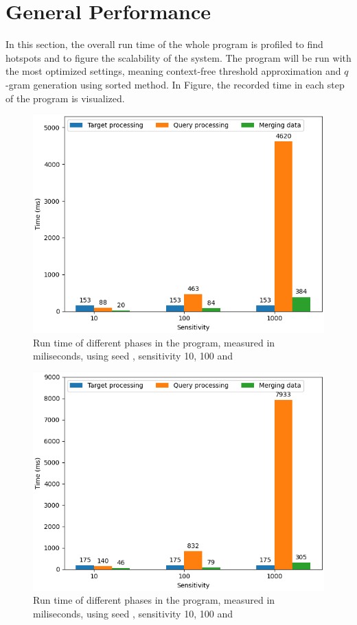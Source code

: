 \documentclass[twoside,a4paper,bsc]{master}
\newcommand{\Qgram}[1]{\(#1\)-gram}
\begin{document}
\section{General Performance}
In this section, the overall run time of the whole program is profiled to
find hotspots and to figure the scalability of the system. The program will
be run with the most optimized settings, meaning context-free threshold
approximation and \Qgram{q} generation using sorted method. In Figure, the
recorded time in each step of the program is visualized.
\begin{figure}
\centering
\includegraphics[scale=0.6]{graphics/program_w6.png}
\caption{Run time of different phases in the program, measured in
miliseconds,
using seed , sensitivity 10, 100 and }
\label{fig:program_w6}
\end{figure}
\begin{figure}
\centering
\includegraphics[scale=0.6]{graphics/program_w7.png}
\caption{Run time of different phases in the program, measured in
miliseconds,
using seed , sensitivity 10, 100 and }
\label{fig:program_w7}
\end{figure}
\end{document}
